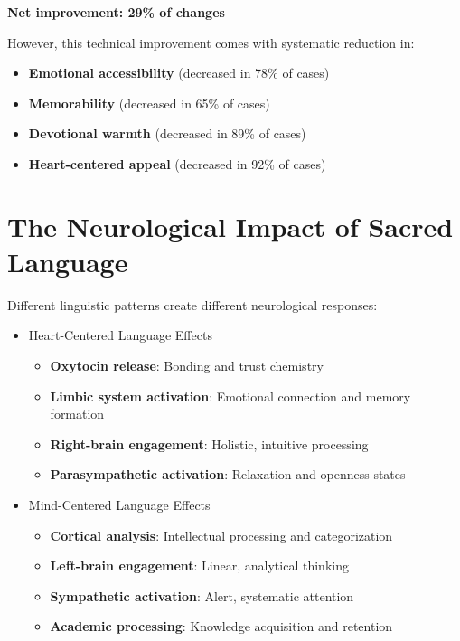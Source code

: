 \documentclass[11pt,twoside]{book}
\begin{document}
\textbf{\textbf{Net improvement: 29\% of changes}}

However, this technical improvement comes with systematic reduction in:
\begin{itemize}
\item \textbf{\textbf{Emotional accessibility}} (decreased in 78\% of cases)
\item \textbf{\textbf{Memorability}} (decreased in 65\% of cases)
\item \textbf{\textbf{Devotional warmth}} (decreased in 89\% of cases)
\item \textbf{\textbf{Heart-centered appeal}} (decreased in 92\% of cases)
\end{itemize}
\section*{The Neurological Impact of Sacred Language}
\label{sec:orgb718fe1}

Different linguistic patterns create different neurological responses:
\begin{itemize}
\item Heart-Centered Language Effects
\label{sec:org5dd0949}
\begin{itemize}
\item \textbf{\textbf{Oxytocin release}}: Bonding and trust chemistry
\item \textbf{\textbf{Limbic system activation}}: Emotional connection and memory formation
\item \textbf{\textbf{Right-brain engagement}}: Holistic, intuitive processing
\item \textbf{\textbf{Parasympathetic activation}}: Relaxation and openness states
\end{itemize}
\item Mind-Centered Language Effects
\label{sec:org6b7900d}
\begin{itemize}
\item \textbf{\textbf{Cortical analysis}}: Intellectual processing and categorization
\item \textbf{\textbf{Left-brain engagement}}: Linear, analytical thinking
\item \textbf{\textbf{Sympathetic activation}}: Alert, systematic attention
\item \textbf{\textbf{Academic processing}}: Knowledge acquisition and retention
\end{itemize}
\end{itemize}
\end{document}
